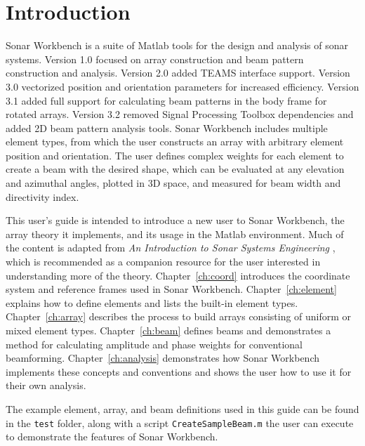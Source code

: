 \chapter{Introduction}\label{ch:intro}

Sonar Workbench is a suite of Matlab tools for the design and analysis of sonar systems. Version 1.0 focused on array construction and beam pattern construction and analysis. Version 2.0 added TEAMS interface support. Version 3.0 vectorized position and orientation parameters for increased efficiency. Version 3.1 added full support for calculating beam patterns in the body frame for rotated arrays. Version 3.2 removed Signal Processing Toolbox dependencies and added 2D beam pattern analysis tools. Sonar Workbench includes multiple element types, from which the user constructs an array with arbitrary element position and orientation. The user defines complex weights for each element to create a beam with the desired shape, which can be evaluated at any elevation and azimuthal angles, plotted in 3D space, and measured for beam width and directivity index.

This user's guide is intended to introduce a new user to Sonar Workbench, the array theory it implements, and its usage in the Matlab environment. Much of the content is adapted from \emph{An Introduction to Sonar Systems Engineering} \cite{Ziomek}, which is recommended as a companion resource for the user interested in understanding more of the theory. Chapter~\ref{ch:coord} introduces the coordinate system and reference frames used in Sonar Workbench. Chapter~\ref{ch:element} explains how to define elements and lists the built-in element types. Chapter~\ref{ch:array} describes the process to build arrays consisting of uniform or mixed element types. Chapter~\ref{ch:beam} defines beams and demonstrates a method for calculating amplitude and phase weights for conventional beamforming. Chapter~\ref{ch:analysis} demonstrates how Sonar Workbench implements these concepts and conventions and shows the user how to use it for their own analysis.

The example element, array, and beam definitions used in this guide can be found in the \texttt{test} folder, along with a script \texttt{CreateSampleBeam.m} the user can execute to demonstrate the features of Sonar Workbench. 